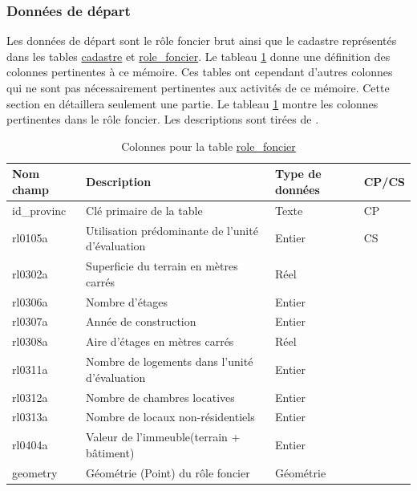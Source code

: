     \subsubsection{Données de départ}
    Les données de départ sont le rôle foncier brut ainsi que le cadastre représentés dans les tables \underline{cadastre} et \underline{role\_foncier}. Le tableau \ref{tab:definition_role_foncier} donne une définition des colonnes pertinentes à ce mémoire. Ces tables ont cependant d'autres colonnes qui ne sont pas nécessairement pertinentes aux activités de ce mémoire. Cette section en détaillera seulement une partie. Le tableau \ref{tab:definition_role_foncier} montre les colonnes pertinentes dans le rôle foncier. Les descriptions sont tirées de \textcite{gouvernement_du_quebec_donnees_2022}.\par
    \begin{table}[h]
       \centering
       \begin{tabular}{m{}|m{}m{}m{}}
            \hline
            Nom champ & Description & Type de données & CP/CS  \\
            \hline
            id\_provinc & Clé primaire de la table & Texte & CP \\  
            rl0105a & Utilisation prédominante de l'unité d'évaluation & Entier & CS  \\
            rl0302a & Superficie du terrain en mètres carrés & Réel & \\ 
            rl0306a & Nombre d'étages & Entier & \\
            rl0307a & Année de construction & Entier & \\
            rl0308a & Aire d'étages en mètres carrés & Réel & \\
            rl0311a & Nombre de logements dans l'unité d'évaluation & Entier &  \\
            rl0312a & Nombre de chambres locatives & Entier & \\
            rl0313a & Nombre de locaux non-résidentiels & Entier & \\
            rl0404a & Valeur de l'immeuble(terrain + bâtiment) & Entier & \\
            geometry & Géométrie (Point) du rôle foncier & Géométrie & \\
            \hline
       \end{tabular}
       \caption{Colonnes pour la table \underline{role\_foncier}}
       \label{tab:definition_role_foncier}
    \end{table}   
